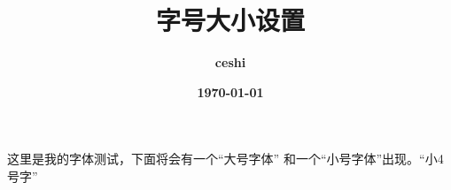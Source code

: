 \documentclass[UTF8,12pt]{article}   %
\title{字号大小设置}
\author{\bf{ceshi}}
\date{\bf{\today}}
\begin{document}
	
	\maketitle
	
	这里是我的字体测试，下面将会有一个“{\Large 大号字体}”
	和一个“{\footnotesize 小号字体}”出现。“{\normalfont 小4号字}”
	
\end{document}
